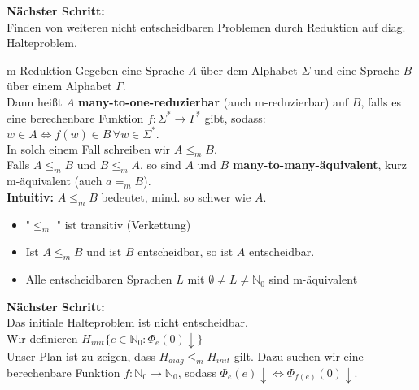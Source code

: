 \textbf{Nächster Schritt:} \\
Finden von weiteren nicht entscheidbaren Problemen durch Reduktion auf diag. Halteproblem.

\begin{defn}{m-Reduktion}
    Gegeben eine Sprache $A$ über dem Alphabet $\Sigma$ und eine Sprache $B$ über einem Alphabet $\Gamma$. \\
    Dann heißt $A$ \textbf{many-to-one-reduzierbar} (auch m-reduzierbar) auf $B$, falls es eine berechenbare Funktion
    $f : \Sigma^* \rightarrow \Gamma^*$ gibt, sodass: \\
    $w \in A \Leftrightarrow f(w) \in B \, \forall w \in \Sigma^*. $\\
    In solch einem Fall schreiben wir $A \leq_m B$. \\

    Falls $A \leq_m B$ und $B \leq_m A$, so sind $A$ und $B$ \textbf{many-to-many-äquivalent}, kurz m-äquivalent (auch $a =_m B$). \\

    \textbf{Intuitiv:} $A \leq_m B$ bedeutet, mind. so schwer wie $A$.
\end{defn}

\begin{bem}
    \begin{itemize}
        \item "$\leq_m$ "{} ist transitiv (Verkettung)
        \item Ist $A \leq_m B$ und ist $B$ entscheidbar, so ist $A$ entscheidbar.
        \item Alle entscheidbaren Sprachen $L$ mit $\emptyset \neq L \neq \mathbb{N}_0$ sind m-äquivalent
    \end{itemize}
\end{bem}

\textbf{Nächster Schritt:} \\
Das initiale Halteproblem ist nicht entscheidbar. \\

Wir definieren $H_{init}\{e \in \mathbb{N}_0 : \Phi_e(0)\downarrow\}$ \\

Unser Plan ist zu zeigen, dass $H_{diag} \leq_m H_{init}$ gilt.
Dazu suchen wir eine berechenbare Funktion $f: \mathbb{N}_0 \rightarrow \mathbb{N}_0$, sodass $\Phi_e(e)\downarrow \Leftrightarrow \Phi_{f(e)}(0)\downarrow$.

